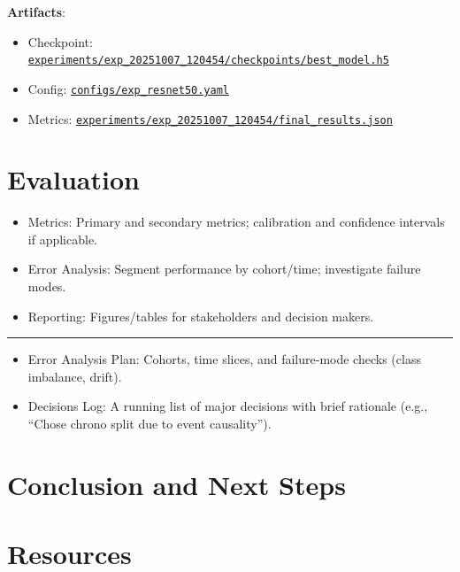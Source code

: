 \documentclass[
  letterpaper,
  DIV=11,
  numbers=noendperiod]{scrartcl}
\providecommand{\tightlist}{%
  \setlength{\itemsep}{0pt}\setlength{\parskip}{0pt}}
\begin{document}
\textbf{Artifacts}:

\begin{itemize}
\tightlist
\item
  Checkpoint:
  \href{../experiments/exp_20251007_120454/checkpoints/best_model.h5}{\texttt{experiments/exp\_20251007\_120454/checkpoints/best\_model.h5}}
\item
  Config:
  \href{../configs/exp_resnet50.yaml}{\texttt{configs/exp\_resnet50.yaml}}
\item
  Metrics:
  \href{../experiments/exp_20251007_120454/final_results.json}{\texttt{experiments/exp\_20251007\_120454/final\_results.json}}
\end{itemize}

\section{Evaluation}\label{evaluation}

\begin{itemize}
\tightlist
\item
  Metrics: Primary and secondary metrics; calibration and confidence
  intervals if applicable.
\item
  Error Analysis: Segment performance by cohort/time; investigate
  failure modes.
\item
  Reporting: Figures/tables for stakeholders and decision makers.
\end{itemize}

\begin{center}\rule{0.5\linewidth}{0.5pt}\end{center}

\begin{itemize}
\tightlist
\item
  Error Analysis Plan: Cohorts, time slices, and failure-mode checks
  (class imbalance, drift).
\item
  Decisions Log: A running list of major decisions with brief rationale
  (e.g., ``Chose chrono split due to event causality'').
\end{itemize}

\section{Conclusion and Next Steps}\label{conclusion-and-next-steps}

\section{Resources}\label{resources}
\end{document}
